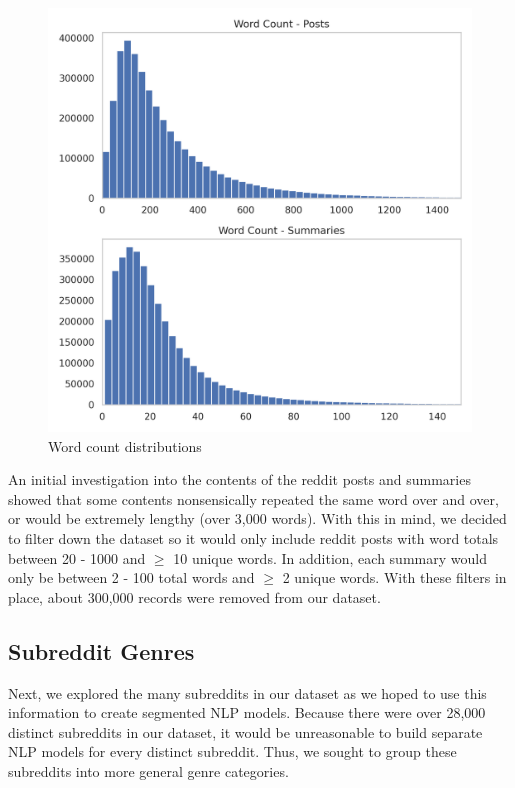 \documentclass[11pt,a4paper, twocolumn]{article}
\begin{document}
\begin{figure}[h]
  \includegraphics[width=.95\linewidth]{word_counts2.png}
  \caption{Word count distributions}
  \label{fig:word_counts}
\end{figure}


An initial investigation into the contents of the reddit posts and summaries showed that some contents nonsensically repeated
the same word over and over, or would be extremely lengthy (over 3,000 words). 
With this in mind, we decided to filter down the dataset so it would only include reddit posts 
with word totals between 20 - 1000 and $\geq$ 10 unique words. 
In addition, each summary would only be between 2 - 100 total words and $\geq$ 2 unique words. 
With these filters in place, about 300,000 records were removed from our dataset. 


\subsection{Subreddit Genres}

Next, we explored the many subreddits in our dataset as we hoped to use this information to create segmented NLP models. 
Because there were over 28,000 distinct subreddits in our dataset, it would be unreasonable to build separate NLP models for every distinct subreddit. 
Thus, we sought to group these subreddits into more general genre categories. 
\end{document}
